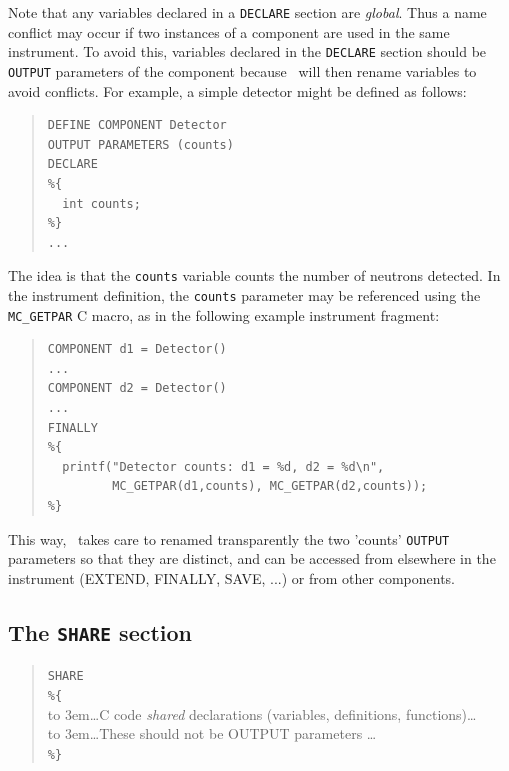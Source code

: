 Note that any variables declared in a \verb+DECLARE+ section are
\emph{global}. Thus a name conflict may occur if two instances of a
component are used in the same instrument. To avoid this, variables
declared in the \texttt{DECLARE} section should be \texttt{OUTPUT} parameters of
the component because \MCS\ will then rename variables to avoid conflicts.
For example, a simple detector might be defined as follows:
\begin{quote}
\begin{verbatim}
DEFINE COMPONENT Detector
OUTPUT PARAMETERS (counts)
DECLARE
%{
  int counts;
%}
...
\end{verbatim}
\end{quote}
The idea is that the \texttt{counts} variable counts the number of
neutrons detected. In the instrument definition, the \texttt{counts}
parameter may be referenced using the \verb+MC_GETPAR+ C macro, as in
the following example instrument fragment:\label{mcgetpar}
\begin{quote}
\begin{verbatim}
COMPONENT d1 = Detector()
...
COMPONENT d2 = Detector()
...
FINALLY
%{
  printf("Detector counts: d1 = %d, d2 = %d\n",
         MC_GETPAR(d1,counts), MC_GETPAR(d2,counts));
%}
\end{verbatim}
\end{quote}
This way, \MCS\ takes care to renamed transparently the two 'counts' \texttt{OUTPUT} parameters so that they are distinct, and can be accessed from elsewhere in the instrument (EXTEND, FINALLY, SAVE, ...) or from other components.

\subsection{The \texttt{SHARE} section}
\label{s:comp-share}
\begin{quote}
  \texttt{SHARE} \\
  \verb|%{| \\
  \hbox to 3em{}\ldots C code \emph{shared} declarations (variables, definitions, functions)\ldots \\
  \hbox to 3em{}\ldots These should not be OUTPUT parameters \ldots \\
  \verb|%}|
\end{quote}

